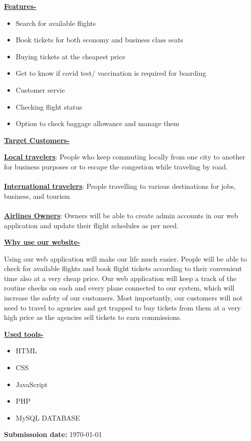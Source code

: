 \documentclass[12pt]{article}
\begin{document}
\LARGE \textbf{\underline{Features-}}  
\normalsize
\begin{itemize}
\itemsep0em
\item Search for available flights
\item Book tickets for both economy and business class seats
\item Buying tickets at the cheapest price
\item Get to know if covid test/ vaccination is required for boarding
\item Customer servie
\item Checking flight status
\item Option to check baggage allowance and manage them  \\ 
\end{itemize} 
\LARGE \textbf{\underline{Target Customers-}}   \\ 
\normalsize
\begin{singlespace}
\textbf{\underline{Local travelers}}: People who keep commuting locally from one city to another
for business purposes or to escape the congestion while traveling by road.\\~\\
\textbf{\underline{International travelers}}: People travelling to various destinations for jobs,
business, and tourism\\~\\
\textbf{\underline{Airlines Owners}}: Owners will be able to create admin accounts in our web
application and update their flight schedules as per need.\\
\end{singlespace}
\vspace{5mm}
\LARGE \textbf{\underline{Why use our website-}}   \\ \vspace{2mm}
\normalsize
\begin{singlespace}
Using our web application will make our life much easier. People will be able to
check for available flights and book flight tickets according to their convenient
time also at a very cheap price. Our web application will keep a track of the
routine checks on each and every plane connected to our system, which will
increase the safety of our customers. Most importantly, our customers will not
need to travel to agencies and get trapped to buy tickets from them at a very high 
price as the agencies sell tickets to earn commissions.\\
\end{singlespace}
\vspace{5mm}
\LARGE \textbf{\underline{Used tools-}}   \\
\normalsize
\begin{itemize}
\itemsep0em
\item HTML
\item CSS
\item JavaScript
\item PHP
\item MySQL DATABASE
\end{itemize}
\vspace*{8\baselineskip} 
\large \color{red}  \textbf{Submissoion date:} \color{black} \today
\end{document}
